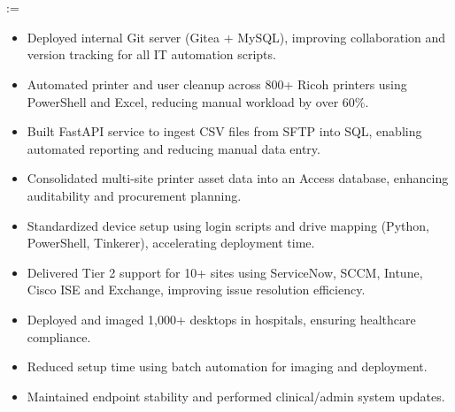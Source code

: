 \documentclass[10pt,a4paper,ragged2e,withhyper]{altacv}
\makeatletter
\renewcommand{\makecvheader}{
  \begin{center}
    {\Huge\bfseries\color{name}\MakeUppercase{\@name}}\\[1ex]
    {\large\bfseries\color{tagline}\@tagline}\\[1ex]
    \@for\@tempa:=\@personalinfo\do{%
      \@tempa\hspace{1.5em}%
    }
  \end{center}
}
\makeatother
\begin{document}
 


\makecvheader

  \begin{paracol}{2}


 \begin{itemize} \item Deployed internal Git server (Gitea + MySQL), improving collaboration and version tracking for all IT automation scripts. \item Automated printer and user cleanup across 800+ Ricoh printers using PowerShell and Excel, reducing manual workload by over 60\%. \item Built FastAPI service to ingest CSV files from SFTP into SQL, enabling automated reporting and reducing manual data entry. \item Consolidated multi-site printer asset data into an Access database, enhancing auditability and procurement planning. \item Standardized device setup using login scripts and drive mapping (Python, PowerShell, Tinkerer), accelerating deployment time. \item Delivered Tier 2 support for 10+ sites using ServiceNow, SCCM, Intune, Cisco ISE and Exchange, improving issue resolution efficiency. \end{itemize}

\divider

 \begin{itemize} \item Deployed and imaged 1,000+ desktops in hospitals, ensuring healthcare compliance. \item Reduced setup time using batch automation for imaging and deployment. \item Maintained endpoint stability and performed clinical/admin system updates. \end{itemize}


\end{paracol}
\end{document}
